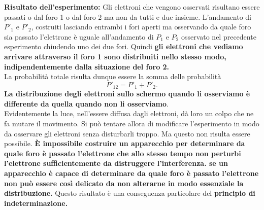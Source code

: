 \textbf{Risultato dell'esperimento:} Gli elettroni che vengono osservati risultano essere passati o dal foro 1 o dal foro 2 ma non da tutti e due insieme. L'andamento di $P'_1$ e $P'_2$, costruiti lasciando entrambi i fori aperti ma osservando da quale foro sia passato l'elettrone è uguale all'andamento di $P_1$ e $P_2$ osservato nel precedente esperimento chiudendo uno dei due fori. Quindi \textbf{gli elettroni che vediamo arrivare attraverso il foro 1 sono distribuiti nello stesso modo, indipendentemente dalla situazione del foro 2.}\\
La probabilità totale risulta dunque essere la somma delle probabilità
\begin{equation}
P'_{12}= P'_1 + P'_2.
\end{equation}
\textbf{La distribuzione degli elettroni sullo schermo quando li osserviamo è differente da quella quando non li osserviamo}.\\
Evidentemente la luce, nell'essere diffusa dagli elettroni, dà loro un colpo che ne fa mutare il movimento. Si può tentare allora di modificare l'esperimento in modo da osservare gli elettroni senza disturbarli troppo. Ma questo non risulta essere possibile. \textbf{È impossibile costruire un apparecchio per determinare da quale foro è passato l'elettrone che allo stesso tempo non perturbi l'elettrone sufficientemente da distruggere l'interferenza. se un apparecchio è capace di determinare da quale foro è passato l'elettrone  non può essere così delicato da non alterarne in modo essenziale la distribuzione.} Questo risultato è una conseguenza particolare del \textbf{principio di indeterminazione.}
